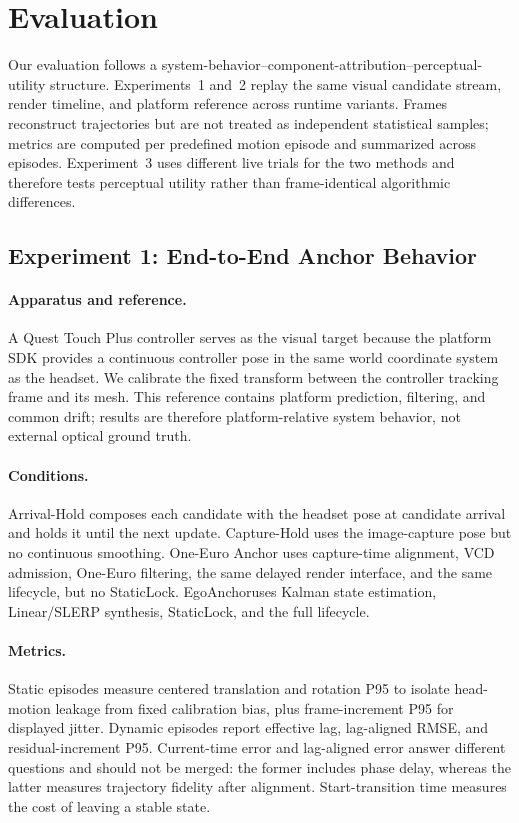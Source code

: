 \documentclass[review]{vgtc}
\newcommand{\system}{EgoAnchor}
\begin{document}
\section{Evaluation}
Our evaluation follows a system-behavior--component-attribution--perceptual-utility structure. Experiments~1 and~2 replay the same visual candidate stream, render timeline, and platform reference across runtime variants. Frames reconstruct trajectories but are not treated as independent statistical samples; metrics are computed per predefined motion episode and summarized across episodes. Experiment~3 uses different live trials for the two methods and therefore tests perceptual utility rather than frame-identical algorithmic differences.

\subsection{Experiment 1: End-to-End Anchor Behavior}
\paragraph{Apparatus and reference.}
A Quest Touch Plus controller serves as the visual target because the platform SDK provides a continuous controller pose in the same world coordinate system as the headset. We calibrate the fixed transform between the controller tracking frame and its mesh. This reference contains platform prediction, filtering, and common drift; results are therefore platform-relative system behavior, not external optical ground truth.

\paragraph{Conditions.}
Arrival-Hold composes each candidate with the headset pose at candidate arrival and holds it until the next update. Capture-Hold uses the image-capture pose but no continuous smoothing. One-Euro Anchor uses capture-time alignment, VCD admission, One-Euro filtering, the same delayed render interface, and the same lifecycle, but no StaticLock. \system uses Kalman state estimation, Linear/SLERP synthesis, StaticLock, and the full lifecycle.

\paragraph{Metrics.}
Static episodes measure centered translation and rotation P95 to isolate head-motion leakage from fixed calibration bias, plus frame-increment P95 for displayed jitter. Dynamic episodes report effective lag, lag-aligned RMSE, and residual-increment P95. Current-time error and lag-aligned error answer different questions and should not be merged: the former includes phase delay, whereas the latter measures trajectory fidelity after alignment. Start-transition time measures the cost of leaving a stable state.
\end{document}
